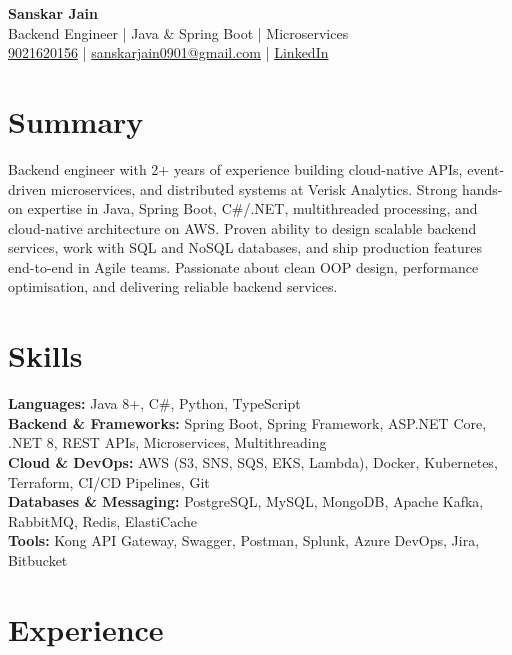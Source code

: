 \documentclass[a4paper,10pt]{article}
\begin{document}
\begin{center}
    {\LARGE \textbf{Sanskar Jain}} \\
    Backend Engineer | Java \& Spring Boot | Microservices \\
    \href{tel:9021620156}{9021620156} \;|\;
    \href{mailto:sanskarjain0901@gmail.com}{sanskarjain0901@gmail.com} \;|\;
    \href{https://www.linkedin.com/in/sanskar-jain0901/}{LinkedIn}
\end{center}

\vspace{3pt}

\section*{Summary}
Backend engineer with 2+ years of experience building cloud-native APIs, event-driven microservices, and distributed systems at Verisk Analytics. Strong hands-on expertise in Java, Spring Boot, C\#/.NET, multithreaded processing, and cloud-native architecture on AWS. Proven ability to design scalable backend services, work with SQL and NoSQL databases, and ship production features end-to-end in Agile teams. Passionate about clean OOP design, performance optimisation, and delivering reliable backend services.

\section*{Skills}
\textbf{Languages:} Java 8+, C\#, Python, TypeScript \\
\textbf{Backend \& Frameworks:} Spring Boot, Spring Framework, ASP.NET Core, .NET 8, REST APIs, Microservices, Multithreading \\
\textbf{Cloud \& DevOps:} AWS (S3, SNS, SQS, EKS, Lambda), Docker, Kubernetes, Terraform, CI/CD Pipelines, Git \\
\textbf{Databases \& Messaging:} PostgreSQL, MySQL, MongoDB, Apache Kafka, RabbitMQ, Redis, ElastiCache \\
\textbf{Tools:} Kong API Gateway, Swagger, Postman, Splunk, Azure DevOps, Jira, Bitbucket

\section*{Experience}
\end{document}
